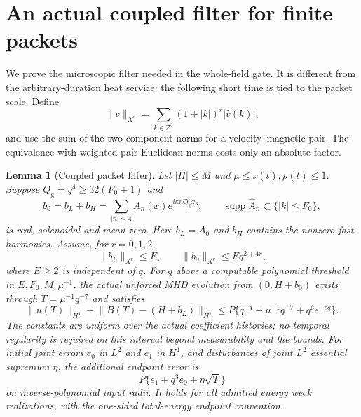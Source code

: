 \documentclass[11pt,a4paper]{amsart}
\newtheorem{lemma}[theorem]{Lemma}
\theoremstyle{definition}
\theoremstyle{remark}
\numberwithin{equation}{section}
\newcommand{\Z}{\mathbb Z}
\newcommand{\norm}[1]{\lVert #1\rVert}
\newcommand{\supp}{\operatorname{supp}}
\begin{document}
\section{An actual coupled filter for finite packets}\label{app:packet}

We prove the microscopic filter needed in the whole-field gate.  It is
different from the arbitrary-duration heat service: the following short
time is tied to the packet scale.  Define
\[
 \norm v_{X^r}=\sum_{k\in\Z^3}(1+|k|)^r|\widehat v(k)|,
\]
and use the sum of the two component norms for a velocity--magnetic pair.
The equivalence with weighted pair Euclidean norms costs only an absolute
factor.

\begin{lemma}[Coupled packet filter]\label{lem:coupled-packet}
Let $|H|\le M$ and $\mu\le\nu(t),\rho(t)\le1$.  Suppose
$Q_{\mathrm g}=q^4\ge32(F_0+1)$ and
\begin{equation}\label{eq:appendix-packet-input}
 b_0=b_L+b_H=\sum_{|n|\le4}A_n(x)e^{i\kappa nQ_{\mathrm g}x_3},
 \qquad \supp\widehat A_n\subset\{|k|\le F_0\},
\end{equation}
is real, solenoidal and mean zero.  Here $b_L=A_0$ and $b_H$ contains the
nonzero fast harmonics.  Assume, for $r=0,1,2$,
\begin{equation}\label{eq:appendix-packet-bounds}
 \norm{b_L}_{X^r}\le E,\qquad
 \norm{b_0}_{X^r}\le Eq^{2+4r},
\end{equation}
where $E\ge2$ is independent of $q$.  For $q$ above a computable polynomial
threshold in $E,F_0,M,\mu^{-1}$, the actual unforced MHD evolution from
$(0,H+b_0)$ exists through $T=\mu^{-1}q^{-7}$ and satisfies
\begin{equation}\label{eq:appendix-packet-result}
 \norm{u(T)}_{H^1}+\norm{B(T)-(H+b_L)}_{H^1}
       \le P\{q^{-4}+\mu^{-1}q^{-7}+q^6e^{-cq}\}.
\end{equation}
The constants are uniform over the actual coefficient histories; no temporal
regularity is required on this interval beyond measurability and the bounds.
For initial joint errors $e_0$ in $L^2$ and $e_1$ in $H^1$, and disturbances
of joint $L^2$ essential supremum $\eta$, the additional endpoint error is
\begin{equation}\label{eq:appendix-packet-error}
 P\{e_1+q^3e_0+\eta\sqrt T\}
\end{equation}
on inverse-polynomial input radii.  It holds for all admitted energy weak
realizations, with the one-sided total-energy endpoint convention.
\end{lemma}
\end{document}
